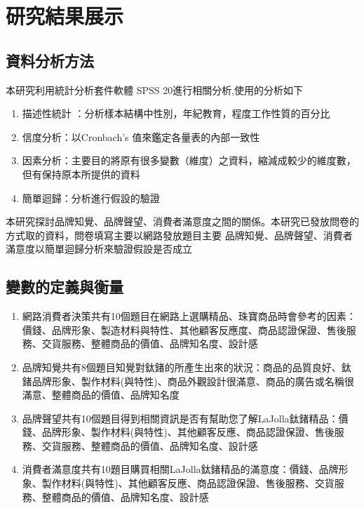 \chapter{研究結果展示}
\section{資料分析方法}
本研究利用統計分析套件軟體 SPSS 20進行相關分析,使用的分析如下
\begin{enumerate}
\item 描述性統計 ：分析樣本結構中性別，年紀教育，程度工作性質的百分比
\item 信度分析：以Cronbach's 值來鑑定各量表的內部一致性
\item 因素分析：主要目的將原有很多變數（維度）之資料，縮減成較少的維度數，但有保持原本所提供的資料
\item 簡單迴歸：分析進行假設的驗證
\end{enumerate}

本研究探討品牌知覺、品牌聲望、消費者滿意度之間的關係。本研究已發放問卷的方式取的資料，問卷填寫主要以網路發放題目主要
品牌知覺、品牌聲望、消費者滿意度以簡單迴歸分析來驗證假設是否成立

\section{變數的定義與衡量}
\begin{enumerate}
\item  網路消費者決策共有10個題目在網路上選購精品、珠寶商品時會參考的因素：價錢、品牌形象、製造材料與特性、其他顧客反應度、商品認證保證、售後服務、交貨服務、整體商品的價值、品牌知名度、設計感
\item 品牌知覺共有8個題目知覺對鈦鍺的所產生出來的狀況：商品的品質良好、鈦鍺品牌形象、製作材料(與特性)、商品外觀設計很滿意、商品的廣告或名稱很滿意、整體商品的價值、品牌知名度
\item 品牌聲望共有10個題目得到相關資訊是否有幫助您了解LaJolla鈦鍺精品：價錢、品牌形象、製作材料(與特性)、其他顧客反應、商品認證保證、售後服務、交貨服務、整體商品的價值、品牌知名度、設計感
\item 消費者滿意度共有10題目購買相關LaJolla鈦鍺精品的滿意度：價錢、品牌形象、製作材料(與特性)、其他顧客反應、商品認證保證、售後服務、交貨服務、整體商品的價值、品牌知名度、設計感
\end{enumerate}

